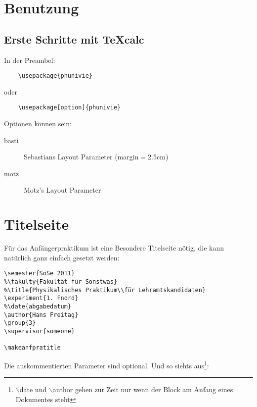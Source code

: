 \documentclass[a4paper]{article}
\newcommand{\texcalc}{{\TeX}calc}
\begin{document}
\section{Benutzung}

\subsection{Erste Schritte mit \texcalc}




In der Preambel:

\begin{verbatim}
	\usepackage{phunivie}
\end{verbatim}

oder

\begin{verbatim}
	\usepackage[option]{phunivie}
\end{verbatim}

Optionen können sein: 

\begin{description}
	\item[basti] Sebastians Layout Parameter (margin$=$2.5cm)
	\item[motz] Motz's Layout Parameter
\end{description}
	

\section{Titelseite}

Für das Anfängerpraktikum ist eine Besondere Titelseite nötig, die 
kann natürlich ganz einfach gesetzt werden:

\begin{verbatim}
\semester{SoSe 2011}
%\fakulty{Fakultät für Sonstwas}
%\title{Physikalisches Praktikum\\für Lehramtskandidaten}
\experiment{1. Fnord}
%\date{abgabedatum}
\author{Hans Freitag}
\group{3}
\supervisor{someone}

\makeanfpratitle
\end{verbatim}

Die auskommentierten Parameter sind optional. Und so siehts 
aus\footnote{$\backslash$date und $\backslash$author gehen zur Zeit nur wenn der Block am 
Anfang eines Dokumentes steht}:

\makeanfpratitle
\end{document}
